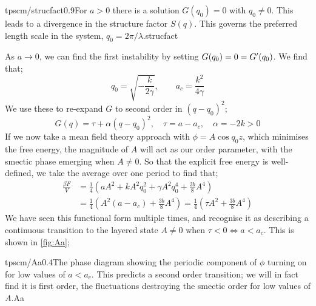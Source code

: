 \begin{mygraphic}{tpscm/strucfact}{0.9}{For $a > 0$ there is a solution $G(q_0) = 0$ with $q_0 \neq 0$. This leads to a divergence in the structure factor $S(q)$. This governs the preferred length scale in the system, $q_0 = 2\pi/\lambda$.}{strucfact}\end{mygraphic}
As $a \rightarrow 0$, we can find the first instability by setting $G(q_0) = 0 = G^{\prime}(q_0)$. We find that;
\begin{equation*}
q_0 = \sqrt{-\frac{k}{2\gamma}}, \qquad a_c = \frac{k^2}{4\gamma}
\end{equation*}
We use these to re-expand $G$ to second order in $(q - q_0)^2$;
\begin{equation*}
G(q) = \tau + \alpha (q - q_0)^2, \quad \tau = a - a_c, \quad \alpha = -2k > 0
\end{equation*}
If we now take a mean field theory approach with $\phi = A \cos q_0 z$, which minimises the free energy, the magnitude of $A$ will act as our order parameter, with the smectic phase emerging when $A \neq 0$. So that the explicit free energy is well-defined, we take the average over one period to find that;
\begin{align*}
\frac{\beta F}{V} &= \frac{1}{4}\left(a A^2 + kA^2 q_0^2 + \gamma A^2 q_0^4  + \frac{3b}{8}A^4\right) \\
&= \frac{1}{4}\left(A^2 (a - a_c) + \frac{3b}{8}A^4\right) = \frac{1}{4}\left(\tau A^2 + \frac{3b}{8}A^4\right)
\end{align*}
We have seen this functional form multiple times, and recognise it as describing a continuous transition to the layered state $A \neq 0$ when $\tau < 0 \iff a < a_c$. This is shown in \autoref{fig:Aa};
\begin{mygraphic}{tpscm/Aa}{0.4}{The phase diagram showing the periodic component of $\phi$ turning on for low values of $a < a_c$. This predicts a second order transition; we will in fact find it is first order, the fluctuations destroying the smectic order for low values of $A$.}{Aa}\end{mygraphic}
